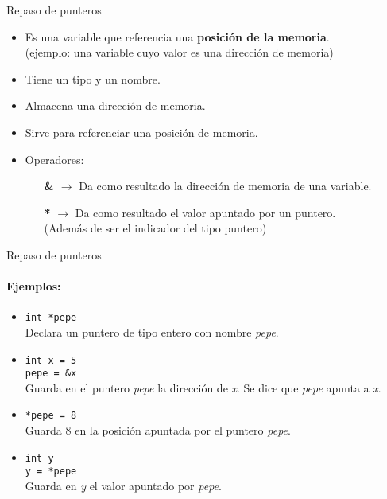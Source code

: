 \documentclass[aspectratio=169]{beamer}
\begin{document}
\begin{frame}{Repaso de punteros}
    \begin{itemize}
    \setlength\itemsep{1.2em}
    \item Es una variable que referencia una \textbf{posición de la memoria}.\\ \small (ejemplo: una variable cuyo valor es una dirección de memoria) \normalsize
    \pause
    \item Tiene un tipo y un nombre.
    \pause
    \item Almacena una dirección de memoria.
    \pause
    \item Sirve para referenciar una posición de memoria.
    \pause
    \item Operadores:
    \begin{itemize}
    \pause
    \item[\textbf{\&}] $\rightarrow$ Da como resultado la dirección de memoria de una variable.
    \pause
    \item[\textbf{*}] $\rightarrow$ Da como resultado el valor apuntado por un puntero.\\ \hskip 0.5cm \footnotesize (Además de ser el indicador del tipo puntero)\normalsize
    \end{itemize}
    \end{itemize}
\end{frame}

\begin{frame}[fragile]{Repaso de punteros}
    \framesubtitle{Ejemplos:}
    \begin{itemize}
    \item \verb|int *pepe| \\ \vskip 0.1cm
    \pause
    Declara un puntero de tipo entero con nombre \textit{pepe}.
    \vskip 0.3cm
    \pause
    \item \verb|int x = 5|\\
    \verb|pepe = &x|\\ \vskip 0.1cm
    \pause
    Guarda en el puntero \textit{pepe} la dirección de \textit{x}. Se dice que \textit{pepe} apunta a \textit{x}.\\
    \vskip 0.3cm
    \pause
    \item \verb|*pepe = 8|\\ \vskip 0.1cm
    \pause
    Guarda 8 en la posición apuntada por el puntero \textit{pepe}.
    \vskip 0.3cm
    \pause
    \item \verb|int y|\\
    \verb|y = *pepe|\\ \vskip 0.1cm
    Guarda en \textit{y} el valor apuntado por \textit{pepe}.
    \end{itemize}
\end{frame}
\end{document}
